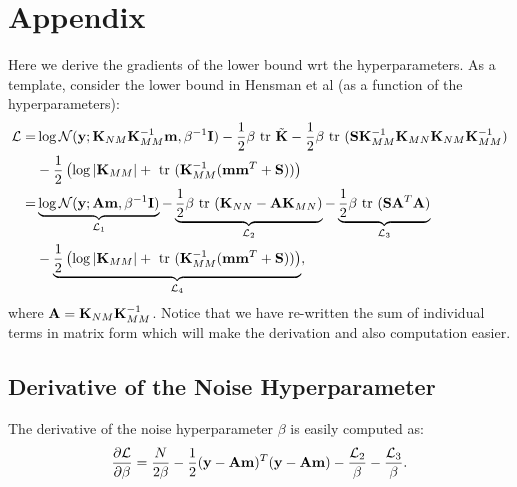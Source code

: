 \documentclass{article} %
\begin{document}

\section{Appendix}
Here we derive the gradients of the lower bound wrt the  hyperparameters.
As a template, consider the lower bound in Hensman et al (as a function of the hyperparameters):
\begin{align}
\nonumber
\mathcal{L}
=& \log \mathcal{N}(\mathbf{y}; \mathbf{K}_{NM} \mathbf{K}_{MM}^{-1} \mathbf{m}, \beta^{-1}\mathbf{I})
 - \frac{1}{2} \beta \mbox{ \rm tr } \tilde{\mathbf{K}}
 - \frac{1}{2} \beta \mbox{ \rm tr } (\mathbf{S}\mathbf{K}_{MM}^{-1} \mathbf{K}_{MN} \mathbf{K}_{NM} \mathbf{K}_{MM}^{-1}) \\  \nonumber
&- \frac{1}{2} \left( \log |\mathbf{K}_{MM}| + \mbox{ \rm tr }(\mathbf{K}_{MM}^{-1}(\mathbf{m} \mathbf{m}^T + \mathbf{S})) \right) \\ \nonumber
=& \underbrace{\log \mathcal{N}(\mathbf{y}; \mathbf{A} \mathbf{m}, \beta^{-1}\mathbf{I})}_{\mathcal{L}_1}
 - \underbrace{\frac{1}{2} \beta \mbox{ \rm tr } (\mathbf{K}_{NN} - \mathbf{A}\mathbf{K}_{MN})}_{\mathcal{L}_2}
 - \underbrace{\frac{1}{2} \beta \mbox{ \rm tr } (\mathbf{S}\mathbf{A}^T\mathbf{A})}_{\mathcal{L}_3} \\  
&- \underbrace{\frac{1}{2} \left( \log |\mathbf{K}_{MM}| + \mbox{ \rm tr }(\mathbf{K}_{MM}^{-1}(\mathbf{m} \mathbf{m}^T + \mathbf{S})) \right)}_{\mathcal{L}_4},
\end{align}
where $\mathbf{A} = \mathbf{K}_{NM} \mathbf{K}_{MM}^{-1}$.
Notice that we have re-written the sum of individual terms in matrix form which will make the derivation and also computation easier.

\subsection{Derivative of the Noise Hyperparameter}
The derivative of the noise hyperparameter $\beta$ is easily computed as:
\begin{align}
\frac{\partial{\mathcal{L}}}{\partial{\beta}} = \frac{N}{2\beta} - \frac{1}{2} (\mathbf{y} - \mathbf{A}\mathbf{m})^T (\mathbf{y} - \mathbf{A}\mathbf{m}) - \frac{\mathcal{L}_2}{\beta} - \frac{\mathcal{L}_3}{\beta}.
\end{align}
\end{document}
